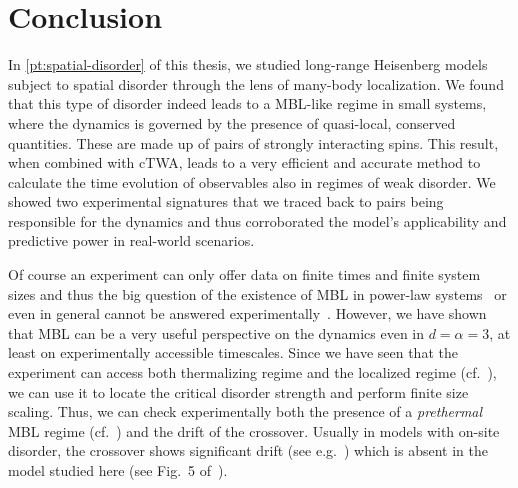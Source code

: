 \chapter{Conclusion}\label{ch:discussion-pair-localization}
In \autoref{pt:spatial-disorder} of this thesis, we studied long-range Heisenberg models subject to spatial disorder through the lens of many-body localization. We found that this type of disorder indeed leads to a MBL-like regime in small systems, where the dynamics is governed by the presence of quasi-local, conserved quantities. These are made up of pairs of strongly interacting spins. This result, when combined with cTWA, leads to a very efficient and accurate method to calculate the time evolution of observables also in regimes of weak disorder. We showed two experimental signatures that we traced back to pairs being responsible for the dynamics and thus corroborated the model's applicability and predictive power in real-world scenarios.

Of course an experiment can only offer data on finite times and finite system sizes and thus the big question of the existence of MBL in power-law systems~\cite{yaoManyBodyLocalizationDipolar2014,burinLocalizationRandomXY2015,burinManybodyDelocalizationStrongly2015,nandkishoreManyBodyLocalized2017} or even in general cannot be answered experimentally~\cite{deroeckStabilityInstabilityDelocalization2017,morningstarAvalanchesManybodyResonances2022,longPhenomenologyPrethermalManyBody2023,scoccoThermalizationPropagationFront2024}. However, we have shown that MBL can be a very useful perspective on the dynamics even in $d=\alpha=3$, at least on experimentally accessible timescales. Since we have seen that the experiment can access both thermalizing regime and the localized regime (cf.~\cite{franzEmergentPairLocalization2024}), we can use it to locate the critical disorder strength and perform finite size scaling. Thus, we can check experimentally both the presence of a \emph{prethermal} MBL regime (cf.~\cite{longPhenomenologyPrethermalManyBody2023}) and the drift of the crossover. Usually in models with on-site disorder, the crossover shows significant drift (see e.g.~\cite{luitzManybodyLocalizationEdge2015}) which is absent in the model studied here (see Fig.~5 of~\cite{braemerPairLocalizationDipolar2022}).  

